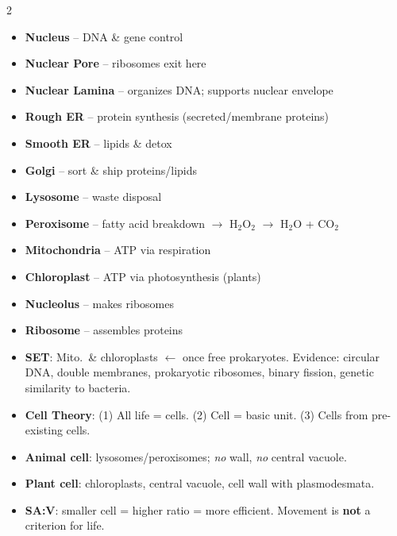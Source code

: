 \documentclass[11pt, letterpaper]{article}
\begin{document}
\vspace{4pt}

\begin{tcolorbox}[colback=partbg, colframe=sectionblue,
  title={\bfseries Must-Know Organelles}, arc=3pt, boxrule=1pt]
\footnotesize
\begin{multicols}{2}
\begin{itemize}[noitemsep, leftmargin=*]
  \item \textbf{Nucleus} -- DNA \& gene control
  \item \textbf{Nuclear Pore} -- ribosomes exit here
  \item \textbf{Nuclear Lamina} -- organizes DNA; supports nuclear envelope
  \item \textbf{Rough ER} -- protein synthesis (secreted/membrane proteins)
  \item \textbf{Smooth ER} -- lipids \& detox
  \item \textbf{Golgi} -- sort \& ship proteins/lipids
  \item \textbf{Lysosome} -- waste disposal
  \item \textbf{Peroxisome} -- fatty acid breakdown $\to$ H$_2$O$_2$ $\to$ H$_2$O + CO$_2$
  \item \textbf{Mitochondria} -- ATP via respiration
  \item \textbf{Chloroplast} -- ATP via photosynthesis (plants)
  \item \textbf{Nucleolus} -- makes ribosomes
  \item \textbf{Ribosome} -- assembles proteins
\end{itemize}
\end{multicols}
\end{tcolorbox}

\vspace{4pt}

\begin{tcolorbox}[colback=part3bg, colframe=sectionpurple,
  title={\bfseries SET, Cell Theory, \& Key Facts}, arc=3pt, boxrule=1pt]
\begin{itemize}[noitemsep, leftmargin=*]
  \item \textbf{SET}: Mito.\ \& chloroplasts $\leftarrow$ once free prokaryotes. Evidence: circular DNA, double membranes, prokaryotic ribosomes, binary fission, genetic similarity to bacteria.
  \item \textbf{Cell Theory}: (1) All life = cells. (2) Cell = basic unit. (3) Cells from pre-existing cells.
  \item \textbf{Animal cell}: lysosomes/peroxisomes; \emph{no} wall, \emph{no} central vacuole.
  \item \textbf{Plant cell}: chloroplasts, central vacuole, cell wall with plasmodesmata.
  \item \textbf{SA:V}: smaller cell = higher ratio = more efficient. Movement is \textbf{not} a criterion for life.
\end{itemize}
\end{tcolorbox}
\end{document}
